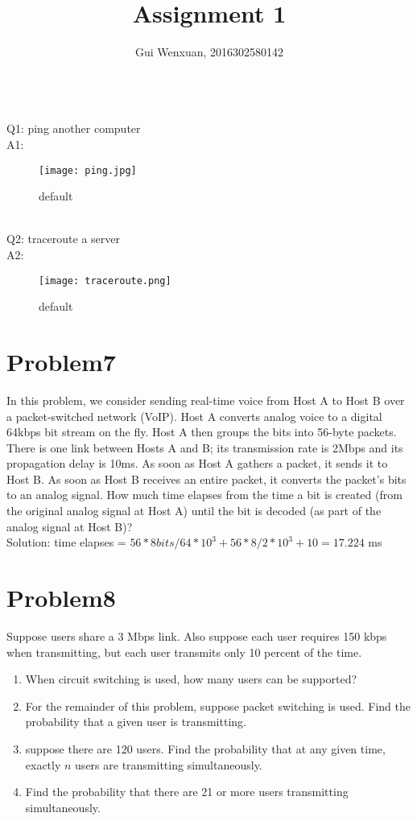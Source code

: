\documentclass{article}
\author{Gui Wenxuan, 2016302580142}
\title{Assignment 1}
\begin{document}
   \maketitle
   ~\\
   Q1: ping another computer\\
   A1: \begin{figure}[ht]
	\centering
	\texttt{[image: ping.jpg]}
	\caption{default}
	\label{ping}
	\end{figure}\\
  Q2: traceroute a server\\
  A2: \begin{figure}[ht]
	\centering
	\texttt{[image: traceroute.png]}
	\caption{default}
	\label{traceroute}
	\end{figure}
\newpage
\section{Problem7} In this problem, we consider sending real-time voice from Host A to Host B over a packet-switched network (VoIP). Host A converts analog voice to a digital 64kbps bit stream on the fly. Host A then groups the bits into 56-byte packets. There is one link between Hosts A and B; its transmission rate is 2Mbps and its propagation delay is 10ms. As soon as Host A gathers a packet, it sends it to Host B. As soon as Host B receives an entire packet, it converts the packet’s bits to an analog signal. How much time elapses from the time a bit is created (from the original analog signal at Host A) until the bit is decoded (as part of the analog signal at Host B)?\\


  Solution: time elapses = $56*8 bits / 64*10^3 + 56*8 / 2*10^3 + 10 = 17.224$ ms\\
\newpage
\section{Problem8} Suppose users share a 3 Mbps link. Also suppose each user requires 150 kbps when transmitting, but each user transmits only 10 percent of the time.\\
  \begin{enumerate}
  \item When circuit switching is used, how many users can be supported?
  \item For the remainder of this problem, suppose packet switching is used. Find the probability that a given user is transmitting.
  \item suppose there are 120 users. Find the probability that at any given time, exactly $n$ users are transmitting simultaneously.
  \item Find the probability that there are 21 or more users transmitting simultaneously.
  \end{enumerate}
  
\end{document}

